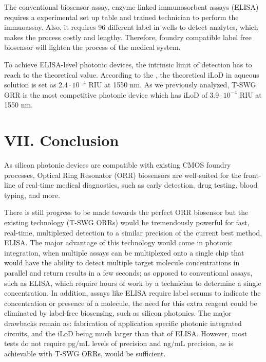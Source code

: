 \documentclass[aps,prl,twocolumn, superscriptaddress,nobalancelastpage]{revtex4}
\begin{document}

The conventional biosensor assay, enzyme-linked immunosorbent assays (ELISA) requires a experimental set up table and trained technician to perform the immuoassay. Also, it requires 96 different label in wells to detect analytes, which makes the process costly and lengthy. Therefore, foundry compatible label free biosensor will lighten the process of the medical system.

To achieve ELISA-level photonic devices, the intrinsic limit of detection has to reach to the theoretical value. According to the \cite{labelfree2}, the theoretical iLoD in aqueous solution is set as $2.4 \cdot 10^{-4}$ RIU at 1550 nm. As we previously analyzed, T-SWG ORR is the most competitive photonic device which has iLoD of $3.9 \cdot 10^{-4}$ RIU at 1550 nm. 







\section{VII. Conclusion}
\vspace{-1em}
As silicon photonic devices are compatible with existing CMOS foundry processes, Optical Ring Resonator (ORR) biosensors are well-suited for the front-line of real-time medical diagnostics, such as early detection, drug testing, blood typing, and more. 

There is still progress to be made towards the perfect ORR biosensor but the existing technology (T-SWG ORRs) would be tremendously powerful for fast, real-time, multiplexed detection to a similar precision of the current best method, ELISA. The major advantage of this technology would come in photonic integration, when multiple assays can be multiplexed onto a single chip that would have the ability to detect multiple target molecule concentrations in parallel and return results in a few seconds; as opposed to conventional assays, such as ELISA, which require hours of work by a technician to determine a single concentration. In addition, assays like ELISA require label serums to indicate the concentration or presence of a molecule, the need for this extra reagent could be eliminated by label-free biosensing, such as silicon photonics. The major drawbacks remain as: fabrication of application specific photonic integrated circuits, and the iLoD being much larger than that of ELISA. However, most tests do not require pg/mL levels of precision and ng/mL precision, as is achievable with T-SWG ORRs, would be sufficient.
\end{document}
